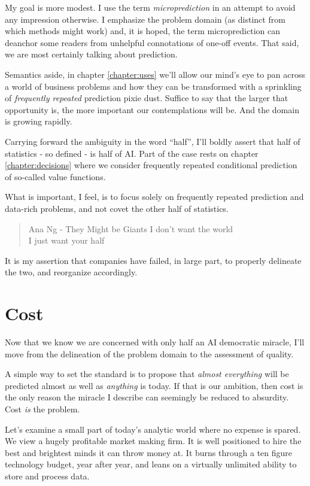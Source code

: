 My goal is more modest. I use the term {\em microprediction} in an attempt to avoid any impression otherwise. I emphasize the problem domain (as distinct from which methods might work) and, it is hoped, the term microprediction can deanchor some readers from unhelpful connotations of one-off events. That said, we are most certainly talking about prediction.  

Semantics aside, in chapter \ref{chapter:uses} we'll allow our mind's eye to pan across a world of business problems and how they can be transformed with a sprinkling of {\em frequently repeated} prediction pixie dust. Suffice to say that the larger that opportunity is, the more important our contemplations will be. And the domain is growing rapidly. 

Carrying forward the ambiguity in the word ``half'', I'll boldly assert that 
half of statistics - so defined - is half of AI. Part of the case rests on chapter \ref{chapter:decisions} where we consider frequently repeated conditional prediction of so-called value functions.


What is important, I feel, is to focus solely on frequently repeated prediction and data-rich problems, and not covet the other half of statistics. 

\begin{quote}{Ana Ng - They Might be Giants \cite{ana}}
    I don't want the world  \\
    I just want your half
\end{quote}

It is my assertion that companies have failed, in large part, to properly delineate the two, and reorganize accordingly. 



\section{Cost}
Now that we know we are concerned with only half an AI democratic miracle, I'll move from the delineation of the problem domain to the assessment of quality. 

A simple way to set the standard is to propose that {\em almost everything} will be predicted almost as well as {\em anything} is today. If that is our ambition, then cost is the only reason the miracle I describe can seemingly be reduced to absurdity. Cost {\em is} the problem. 

Let's examine a small part of today's analytic world where no expense is spared. We view a hugely profitable market making firm. It is well positioned to hire the best and brightest minds it can throw money at. It burns through a ten figure technology budget, year after year, and leans on a virtually unlimited ability to store and process data. 

